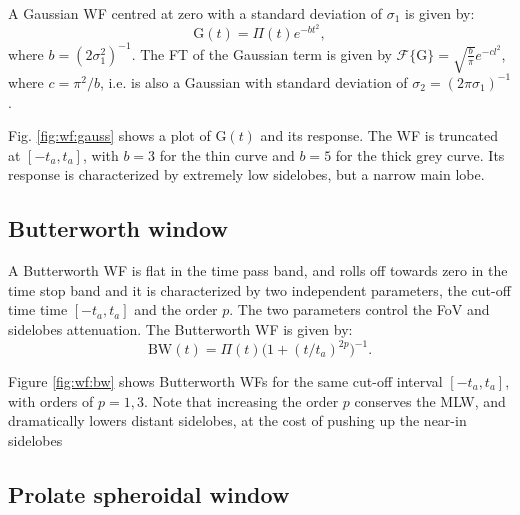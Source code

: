 \documentclass[useAMS,usenatbib]{mn2e}
\begin{document}

A Gaussian WF centred at zero with a standard deviation of $\sigma_1$ is given by: 
\begin{equation}
\mathrm{G}(t)= \Pi(t) e^{-bt^{2}}, \label{eq:gauss}
\end{equation}
where $b=(2\sigma_1^2)^{-1}$. The FT of the Gaussian term is given by 
$\mathcal{F}\big\{\mathrm{G}\big\}=\sqrt{\frac{b}{\pi}}e^{-cl^2}$, where $c=\pi^2/b$, i.e.
is also a Gaussian with standard deviation of $\sigma_2= (2\pi\sigma_1)^{-1}$.

Fig. \ref{fig:wf:gauss} shows a plot of $\mathrm{G}(t)$ and its response. 
The WF is truncated at $[-t_a,t_a]$, with $b = 3$ for the thin curve and $b=5$ for the thick grey curve. 
Its response is characterized by extremely low sidelobes, but a narrow main lobe.

\subsection{Butterworth window}


A Butterworth WF is flat in the time pass band, and rolls off towards zero in the time stop band and it is 
characterized by two independent parameters, the cut-off time time $[-t_a,t_a]$ and the order $p$. 
The two parameters control the 
FoV and sidelobes attenuation. The Butterworth WF is given by:
\begin{equation}
\mathrm{BW}(t)= \Pi(t) \Big(1 + (t/t_a)^{2p}\Big)^{-1}.
\end{equation}

Figure \ref{fig:wf:bw} shows Butterworth WFs for the same cut-off interval $[-t_a,t_a]$, with orders of $p=1,3$. Note that increasing 
the order $p$ conserves the MLW, and dramatically lowers distant sidelobes, at the cost of pushing up the near-in sidelobes

\subsection{Prolate spheroidal window}

\end{document}
